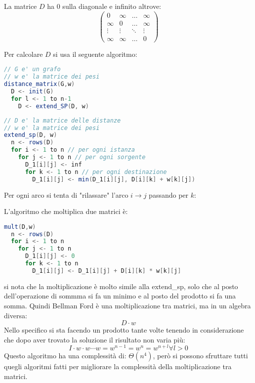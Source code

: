\documentclass[a4paper]{article}
\begin{document}
La matrice \( D \) ha 0 sulla diagonale e infinito altrove:
\[
  \begin{pmatrix} 
    0 & \infty & \ldots & \infty\\
    \infty & 0 & \ldots & \infty\\
    \vdots & \vdots & \ddots & \vdots\\
    \infty & \infty & \ldots & 0
  \end{pmatrix} 
\] 

Per calcolare \( D \) si usa il seguente algoritmo:
\begin{lstlisting}[language=Scala]
// G e' un grafo
// w e' la matrice dei pesi
distance_matrix(G,w)
  D <- init(G)
  for l <- 1 to n-1
    D <- extend_SP(D, w)
\end{lstlisting}
\begin{lstlisting}[language=Scala]
// D e' la matrice delle distanze
// w e' la matrice dei pesi
extend_sp(D, w)
  n <- rows(D)
  for i <- 1 to n // per ogni istanza
    for j <- 1 to n // per ogni sorgente
      D_1[i][j] <- inf
      for k <- 1 to n // per ogni destinazione
        D_1[i][j] <- min(D_1[i][j], D[i][k] + w[k][j])
\end{lstlisting}
Per ogni arco si tenta di "rilassare" l'arco \( i \to j \) passando per \( k \):
\begin{figure}[H]
  \centering
\end{figure}
L'algoritmo che moltiplica due matrici è:
\begin{lstlisting}[language=Scala]
mult(D,w)
  n <- rows(D)
  for i <- 1 to n
    for j <- 1 to n
      D_1[i][j] <- 0
      for k <- 1 to n
        D_1[i][j] <- D_1[i][j] + D[i][k] * w[k][j]
\end{lstlisting}
si nota che la moltiplicazione è molto simile alla extend\_sp, solo che al posto
dell'operazione di sommma si fa un minimo e al posto del prodotto si fa una somma.
Quindi Bellman Ford è una moltiplicazione tra matrici, ma in un algebra diversa:
\[
  D \cdot w
\] 
Nello specifico si sta facendo un prodotto tante volte tenendo in considerazione che
dopo aver trovato la soluzione il risultato non varia più:
\[
  I \cdot w \cdot w \cdots w = w^{n-1} = w^{n} = w^{n+l} \forall l > 0
\] 
Questo algoritmo ha una complessità di: \( \Theta (n^4) \), però si possono sfruttare
tutti quegli algoritmi fatti per migliorare la complessità della moltiplicazione tra
matrici.
\end{document}
